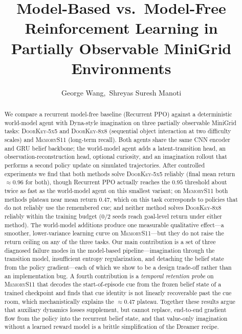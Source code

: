 \documentclass[letterpaper]{article}
\title{Model-Based vs.\ Model-Free Reinforcement Learning in\\
Partially Observable MiniGrid Environments}
\author{
    George Wang,\ Shreyas Suresh Manoti\\
}
\begin{document}
\maketitle

\begin{abstract}
We compare a recurrent model-free baseline (Recurrent PPO) against a
deterministic world-model agent with Dyna-style imagination on three
partially observable MiniGrid tasks: \textsc{DoorKey-5x5} and
\textsc{DoorKey-8x8} (sequential object interaction at two difficulty
scales) and \textsc{MemoryS11} (long-term recall). Both agents share the
same CNN encoder and GRU belief backbone; the world-model agent adds a
latent-transition head, an observation-reconstruction head, optional
curiosity, and an imagination rollout that performs a second policy update
on simulated trajectories. After controlled experiments we find that both
methods solve \textsc{DoorKey-5x5} reliably (final mean return $\approx
0.96$ for both), though Recurrent PPO actually reaches the $0.95$
threshold about twice as fast as the world-model agent on this smallest
variant; on \textsc{MemoryS11} both methods plateau near mean return
$0.47$, which on this task corresponds to policies that do not reliably
use the remembered cue; and neither method solves \textsc{DoorKey-8x8}
reliably within the training budget ($0/2$ seeds reach goal-level return
under either method). The world-model additions produce one measurable
qualitative effect---a smoother, lower-variance learning curve on
\textsc{MemoryS11}---but they do not raise the return ceiling on any of
the three tasks. Our main contribution is a set of three
diagnosed failure modes in the model-based pipeline---imagination through
the transition model, insufficient entropy regularization, and detaching
the belief state from the policy gradient---each of which we show to be a
design trade-off rather than an implementation bug. A fourth contribution
is a \emph{temporal retention probe} on \textsc{MemoryS11} that decodes the
start-of-episode cue from the frozen belief state of a trained checkpoint
and finds that cue identity is not linearly recoverable past the cue room,
which mechanistically explains the $\approx 0.47$ plateau. Together these results
argue that auxiliary dynamics losses supplement, but cannot replace,
end-to-end gradient flow from the policy into the recurrent belief state,
and that value-only imagination without a learned reward model is a
brittle simplification of the Dreamer recipe.
\end{abstract}
\end{document}
